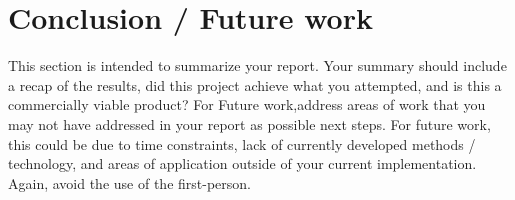 \documentclass[10pt,journal,compsoc]{IEEEtran}
\begin{document}
		\section{Conclusion / Future work}
		This section is intended to summarize your report. Your summary should include a recap of the results, did this project achieve what you attempted, and is this a commercially viable product? 
		For Future work,address areas of work that you may not have addressed in your report as possible next steps. For future work, this could be due to time constraints, lack of currently developed methods / technology, and areas of application outside of your current implementation. Again, avoid the use of the first-person.
			
		
		
			
\end{document}
